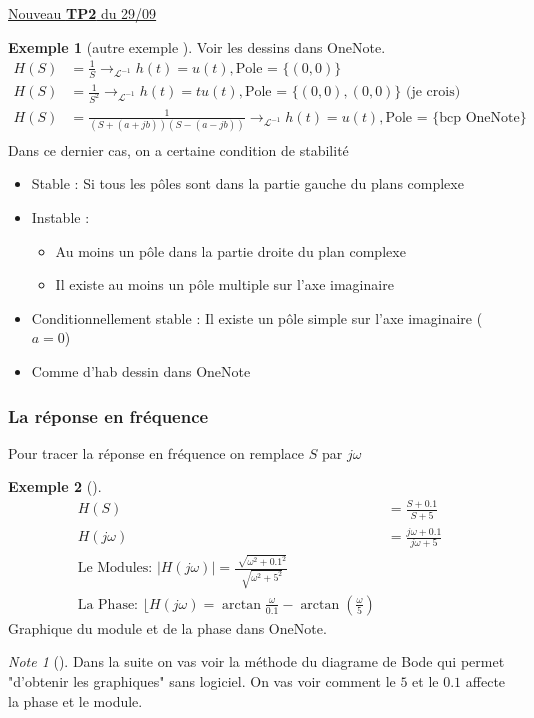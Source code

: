 \documentclass{article}
\theoremstyle{plain}%
\theoremstyle{definition}
\newtheorem{exmp}{Exemple}[section]
\theoremstyle{remark}
\newtheorem*{note}{Note}
\begin{document}
\underline{Nouveau \textbf{TP2} du 29/09} \\

\begin{exmp}[autre exemple ]
    Voir les dessins dans OneNote.
    \begin{align}
        H(S) &= \frac{1}{S} \rightarrow_{\mathcal{L}^{-1}} h(t) = u(t), \text{Pole = } \{(0,0)\} \\
        H(S) &= \frac{1}{S^2} \rightarrow_{\mathcal{L}^{-1}} h(t) = tu(t), \text{Pole = } \{(0,0), (0,0)\} \text{ (je crois)} \\
        H(S) &= \frac{1}{(S+(a+jb))(S-(a-jb))} \rightarrow_{\mathcal{L}^{-1}} h(t) = u(t), \text{Pole = } \{\text{bcp OneNote}\} \\
    \end{align}
    Dans ce dernier cas, on a certaine condition de stabilité \begin{itemize}
        \item Stable : Si tous les pôles sont dans la partie gauche du plans complexe
        \item Instable : \begin{itemize}
            \item Au moins un pôle dans la partie droite du plan complexe
            \item Il existe au moins un pôle multiple sur l'axe imaginaire
        \end{itemize}
        \item Conditionnellement stable : Il existe un pôle simple sur l'axe imaginaire ($a=0$)
        \item Comme d'hab dessin dans OneNote
    \end{itemize}
\end{exmp}

\subsubsection{La réponse en fréquence}
Pour tracer la réponse en fréquence on remplace $ S $ par $ j \omega  $ 
\begin{exmp}[]
    \begin{align*}
        H(S) &= \frac{S + 0.1}{S + 5} \\
        H(j \omega ) &= \frac{j \omega  + 0.1}{j \omega + 5} \\
        \text{Le Modules: }\left| H(j \omega ) \right| = \frac{\sqrt[]{\omega ^2 + 0.1^2}}{\sqrt[]{\omega ^2 + 5^2}} \\ 
        \text{La Phase: } \lfloor H(j \omega) = \arctan \frac{\omega }{0.1} - \arctan (\frac{\omega }{5})
    \end{align*}
    Graphique du module et de la phase dans OneNote. 
\end{exmp}
\begin{note}[]
    Dans la suite on vas voir la méthode du diagrame de Bode qui permet "d'obtenir les graphiques" sans logiciel. On vas voir comment le $ 5 $ et le $ 0.1 $ affecte la phase et le module.
\end{note}
\end{document}
